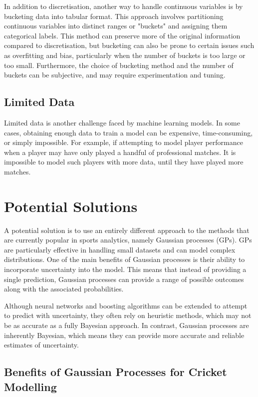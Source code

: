 \documentclass[12pt,a4paper]{report}
\theoremstyle{definition}
\begin{document}
In addition to discretisation, another way to handle continuous variables is by bucketing data into tabular format. 
This approach involves partitioning continuous variables into distinct ranges or "buckets" and assigning them categorical labels. 
This method can preserve more of the original information compared to discretisation, but bucketing can also be prone to certain issues such as overfitting and bias, particularly when the number of buckets is too large or too small. 
Furthermore, the choice of bucketing method and the number of buckets can be subjective, and may require experimentation and tuning. 

\subsection{Limited Data}

Limited data is another challenge faced by machine learning models. 
In some cases, obtaining enough data to train a model can be expensive, time-consuming, or simply impossible. 
For example, if attempting to model player performance when a player may have only played a handful of professional matches.
It is impossible to model such players with more data, until they have played more matches.

\section{Potential Solutions}

A potential solution is to use an entirely different approach to the methods that are currently popular in sports analytics, namely Gaussian processes (GPs).
GPs are particularly effective in handling small datasets and can model complex distributions. 
One of the main benefits of Gaussian processes is their ability to incorporate uncertainty into the model. 
This means that instead of providing a single prediction, Gaussian processes can provide a range of possible outcomes along with the associated probabilities. 

Although neural networks and boosting algorithms can be extended to attempt to predict with uncertainty, they often rely on heuristic methods, which may not be as accurate as a fully Bayesian approach. 
In contrast, Gaussian processes are inherently Bayesian, which means they can provide more accurate and reliable estimates of uncertainty.

\subsection{Benefits of Gaussian Processes for Cricket Modelling}
\end{document}
